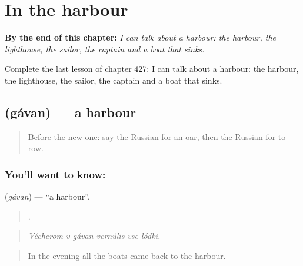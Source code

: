 
\chapter{In the harbour}
\label{ch:ru-in-the-harbour}

\begin{chapteropening}
\textbf{By the end of this chapter:} \emph{I can talk about a harbour: the harbour, the lighthouse, the sailor, the captain and a boat that sinks.}

Complete the last lesson of chapter 427: I can talk about a harbour: the harbour, the lighthouse, the sailor, the captain and a boat that sinks.
\end{chapteropening}

\section[\texorpdfstring{\ru{гавань} (gávan)}{гавань (gávan)}]{ (gávan) — a harbour}

\label{lesson:RU-C427-gavan}



\begin{quote}
Before the new one: say the Russian for an oar, then the Russian for to row.
\end{quote}

\subsection*{You'll want to know: }
\textbf{} (\emph{gávan}) — \textquotedblleft{}a harbour\textquotedblright{}.

\begin{quote}
     .
\end{quote}

\begin{quote}
\emph{Vécherom v gávan vernúlis vse lódki.}
\end{quote}

\begin{quote}
In the evening all the boats came back to the harbour.
\end{quote}

